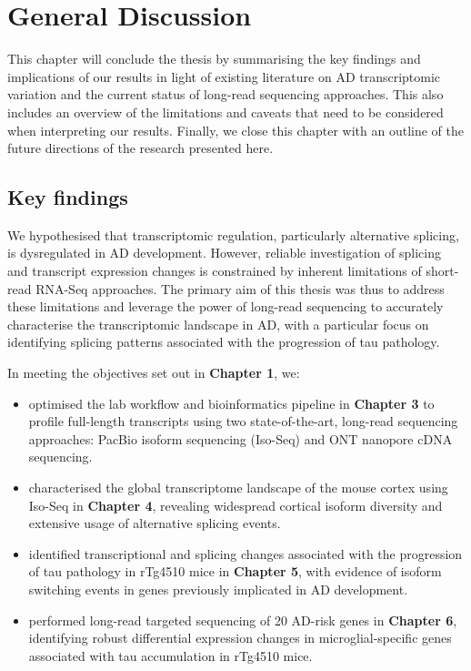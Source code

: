 \chapter{General Discussion}

This chapter will conclude the thesis by summarising the key findings and implications of our results in light of existing literature on AD transcriptomic variation and the current status of long-read sequencing approaches. This also includes an overview of the limitations and caveats that need to be considered when interpreting our results. Finally, we close this chapter with an outline of the future directions of the research presented here.       

\section{Key findings}
We hypothesised that transcriptomic regulation, particularly alternative splicing, is dysregulated in AD development. However, reliable investigation of splicing and transcript expression changes is constrained by inherent limitations of short-read RNA-Seq approaches. The primary aim of this thesis was thus to address these limitations and leverage the power of long-read sequencing to accurately characterise the transcriptomic landscape in AD, with a particular focus on identifying splicing patterns associated with the progression of tau pathology.

In meeting the objectives set out in \textbf{Chapter 1}, we:
\begin{itemize}
	\item optimised the lab workflow and bioinformatics pipeline in \textbf{Chapter 3} to profile full-length transcripts using two state-of-the-art, long-read sequencing approaches: PacBio isoform sequencing (Iso-Seq) and ONT nanopore cDNA sequencing.  
	
	\item characterised the global transcriptome landscape of the mouse cortex using Iso-Seq in \textbf{Chapter 4}, revealing widespread cortical isoform diversity and extensive usage of alternative splicing events. 
	
	\item identified transcriptional and splicing changes associated with the progression of tau pathology in rTg4510 mice in \textbf{Chapter 5}, with evidence of isoform switching events in genes previously implicated in AD development. 
	
	\item performed long-read targeted sequencing of 20 AD-risk genes in \textbf{Chapter 6}, identifying robust differential expression changes in microglial-specific genes associated with tau accumulation in rTg4510 mice.    
\end{itemize}


